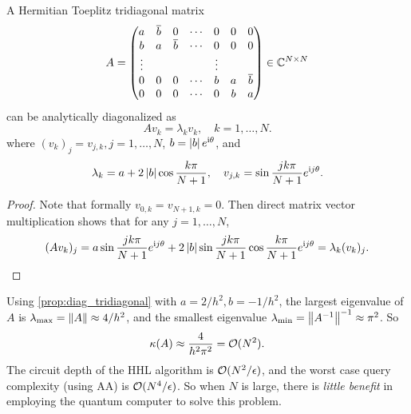 \begin{prop}
A Hermitian Toeplitz tridiagonal matrix
\begin{equation}
A=\begin{pmatrix}
a & \overline{b} & 0 & \cdots & 0 & 0 & 0\\
b &  a & \overline{b} & \cdots & 0 & 0 & 0\\
\vdots &&  &&       \vdots\\
0 & 0 & 0  &  \cdots & b & a & \overline{b} \\
0 & 0 & 0  &  \cdots & 0 & b & a
\end{pmatrix}\in\mathbb{C}^{N\times N}
\end{equation}
can be analytically diagonalized as
\begin{equation}
Av_k=\lambda_k v_k, \quad k=1,\ldots,N.
\end{equation}
where $(v_k)_j=v_{j,k}, j=1,\ldots,N$, $b=\left\lvert b\right\rvert e^{\mathrm{i} \theta}$, and 
\begin{equation}
\lambda_k=a+2\left\lvert b\right\rvert\cos \frac{k\pi}{N+1}, \quad v_{j,k}=\sin \frac{jk\pi}{N+1} e^{\mathrm{i} j\theta}.
\end{equation}
\label{prop:diag_tridiagonal}
\end{prop}
\begin{proof}
Note that formally $v_{0,k}=v_{N+1,k}=0$. Then direct matrix vector multiplication shows that for any $j=1,\ldots,N$,
\begin{equation}
(A v_k)_j=a \sin \frac{jk\pi}{N+1} e^{\mathrm{i} j\theta} + 2\left\lvert b\right\rvert \sin \frac{jk\pi}{N+1}\cos \frac{k\pi}{N+1}e^{\mathrm{i} j\theta}=\lambda_k (v_k)_{j}.
\end{equation}
\end{proof}
 
Using \cref{prop:diag_tridiagonal} with $a=2/h^2,b=-1/h^2$, the largest eigenvalue of $A$ is $\lambda_{\max}=\left\lVert A\right\rVert\approx 4/h^2$, and the smallest eigenvalue $\lambda_{\min}=\left\lVert A^{-1}\right\rVert^{-1}\approx \pi^2$. So 
\begin{equation}
\kappa(A)\approx \frac{4}{h^2\pi^2}=\mathcal{O}(N^2).
\end{equation}
The circuit depth of the HHL algorithm is $\mathcal{O}(N^2/\epsilon)$, and the worst case query complexity (using AA) is $\mathcal{O}(N^4/\epsilon)$.
So when $N$ is large, there is \emph{little benefit} in employing the quantum computer to solve this problem.


